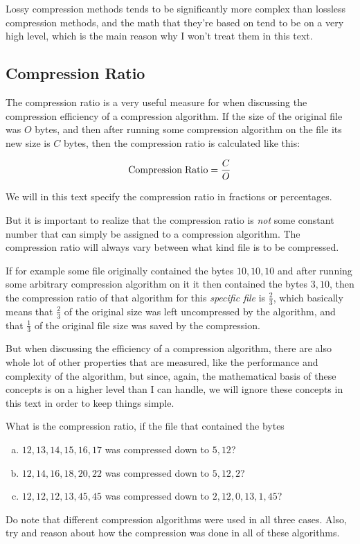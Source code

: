Lossy compression methods tends to be significantly more complex than
lossless compression methods, and the math that they're based on tend
to be on a very high level, which is the main reason why I won't treat
them in this text.

\subsection{Compression Ratio}

The compression ratio is a very useful
measure for when discussing the compression efficiency of a
compression algorithm. If the size of the original file was $O$ bytes,
and then after running some compression algorithm on the file its new
size is $C$ bytes, then the compression ratio is calculated like this:

\begin{equation*}
  {\rm Compression\;Ratio} = \frac{C}{O}
\end{equation*}

We will in this text specify the compression ratio in fractions or
percentages.

But it is important to realize that the compression ratio is
\textit{not} some constant number that can simply be assigned to a
compression algorithm. The compression ratio will always vary between
what kind file is to be compressed.

If for example some file originally contained the bytes $10,10,10$ and
after running some arbitrary compression algorithm on it it then
contained the bytes $3,10$, then the compression ratio of that
algorithm for this \textit{specific file} is $\frac{2}{3}$, which
basically means that $\frac{2}{3}$ of the original size was left
uncompressed by the algorithm, and that $\frac{1}{3}$ of the original
file size was saved by the compression.

But when discussing the efficiency of a compression algorithm, there
are also whole lot of other properties that are measured, like the
performance and complexity of the algorithm, but since, again, the
mathematical basis of these concepts is on a higher level than I can
handle, we will ignore these concepts in this text in order to keep
things simple.

\begin{Exercise}[label={compression-ratio}]
  What is the compression ratio, if the file that contained the bytes

  \begin{enumerate}[(a)]
  \item $12,13,14,15,16,17$ was compressed down to $5,12$?
  \item $12,14,16,18,20,22$ was compressed down to $5,12,2$?
  \item $12,12,12,13,45,45$ was compressed down to $2,12,0,13,1,45$?
  \end{enumerate}

  Do note that different compression algorithms were used in all three
  cases. Also, try and reason about how the compression was done in
  all of these algorithms.

\end{Exercise}

